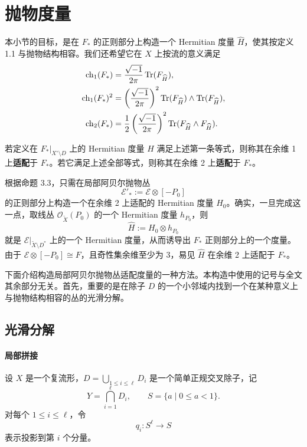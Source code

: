 \section{抛物度量}

本小节的目标，是在 \(F_*\) 的正则部分上构造一个 Hermitian 度量 \(\widehat{H}\)，使其按定义 1.1 与抛物结构相容。我们还希望它在 \(X\) 上按流的意义满足
\begin{align*}
\operatorname{ch}_1(F_*)&=\frac{\sqrt{-1}}{2\pi}\operatorname{Tr}(F_{\widehat{H}}),\\
\operatorname{ch}_1(F_*)^2&=\left(\frac{\sqrt{-1}}{2\pi}\right)^2
\operatorname{Tr}(F_{\widehat{H}})\wedge \operatorname{Tr}(F_{\widehat{H}}),\\
\operatorname{ch}_2(F_*)&=\frac12\left(\frac{\sqrt{-1}}{2\pi}\right)^2
\operatorname{Tr}(F_{\widehat{H}}\wedge F_{\widehat{H}}).
\end{align*}

\begin{definition}
若定义在 \(F_*|_{X^\circ\setminus D}\) 上的 Hermitian 度量 \(H\) 满足上述第一条等式，则称其在余维 1 上\textbf{适配}于 \(F_*\)。若它满足上述全部等式，则称其在余维 2 上\textbf{适配}于 \(F_*\)。
\end{definition}

根据命题 3.3，只需在局部阿贝尔抛物丛
\[
\mathcal E'_*:=\mathcal E\otimes [-P_0]
\]
的正则部分上构造一个在余维 2 上适配的 Hermitian 度量 \(H_0\)。确实，一旦完成这一点，取线丛 \(\mathcal O_{\widetilde X}(P_0)\) 的一个 Hermitian 度量 \(h_{P_0}\)，则
\[
\widehat{H}:=H_0\otimes h_{P_0}
\]
就是 \(\mathcal E|_{\widetilde X\setminus D^*}\) 上的一个 Hermitian 度量，从而诱导出 \(F_*\) 正则部分上的一个度量。由于 \(\mathcal E\otimes[-P_0]\cong F\)，且奇性集余维至少为 3，易见 \(\widehat{H}\) 在余维 2 上适配于 \(F_*\)。

下面介绍构造局部阿贝尔抛物丛适配度量的一种方法。本构造中使用的记号与全文其余部分无关。首先，重要的是在除子 \(D\) 的一个小邻域内找到一个在某种意义上与抛物结构相容的丛的光滑分解。

\subsection{光滑分解}

\paragraph{局部拼接}
设 \(X\) 是一个复流形，\(D=\bigcup_{1\le i\le \ell}D_i\) 是一个简单正规交叉除子，记
\[
Y=\bigcap_{i=1}^\ell D_i,\qquad S=\{a\mid 0\le a<1\}.
\]
对每个 \(1\le i\le \ell\)，令
\[
q_i:S^\ell\to S
\]
表示投影到第 \(i\) 个分量。

